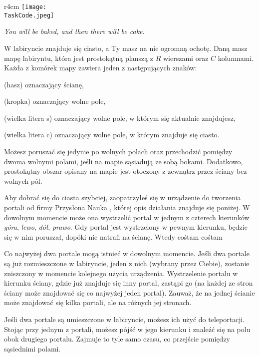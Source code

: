 \documentclass{boi2014-pl}
\renewcommand{\TaskCode}{portals}
\newcommand{\constant}[1]{{\tt #1}}
\begin{document}
    \begin{wrapfigure}[4]{r}{4cm}
        \vspace{-24pt}
		\texttt{[image: \\TaskCode.jpeg]}
	\end{wrapfigure}

    \emph{You will be baked, and then there will be cake.}

    W labiryncie znajduje się ciasto, a Ty masz na nie ogromną ochotę.
    Daną masz mapę labiryntu, która jest prostokątną planszą z $R$ wierszami oraz $C$ kolumnami.
    Każda z komórek mapy zawiera jeden z następujących znaków:
    \begin{description}[itemindent=1pt]
    	\item[\constant{\#}] (hasz) oznaczający ścianę,
        \item[\constant{.}] (kropka) oznaczający wolne pole,
        \item[\constant{S}] (wielka litera s) oznaczający wolne pole, w którym się aktualnie znajdujesz,
        \item[\constant{C}] (wielka litera c) oznaczający wolne pole, w którym znajduje się ciasto.
    \end{description}

    Możesz poruszać się jedynie po wolnych polach oraz przechodzić pomiędzy dwoma wolnymi polami,
    jeśli na mapie sąsiadują ze sobą bokami.
    Dodatkowo, prostokątny obszar opisany na mapie jest otoczony z zewnątrz przez ściany bez wolnych pól.

    Aby dobrać się do ciasta szybciej, zaopatrzyłeś się w urządzenie do tworzenia portali od firmy
    Przysłona Nauka \texttrademark{}, której opis działania znajduje się poniżej.
    W dowolnym momencie może ona wystrzelić portal w jednym z czterech kierunków \emph{góra}, \emph{lewo}, \emph{dół}, \emph{prawo}.
    Gdy portal jest wystrzelony w pewnym kierunku, będzie się w nim poruszał, dopóki nie natrafi na ścianę.
    Wtedy cośtam cośtam
    
    Co najwyżej dwa portale mogą istnieć w dowolnym momencie.
    Jeśli dwa portale są już rozmieszczone w labiryncie, jeden z nich (wybrany przez Ciebie), zostanie zniszczony w momencie kolejnego użycia urządzenia.
    Wystrzelenie portalu w kierunku ściany, gdzie już znajduje się inny portal, zastąpi go (na każdej ze stron ściany może znajdować się co najwyżej jeden portal).
    Zauważ, że na jednej ścianie może znajdować się kilka portali, ale na różnych jej stronach.

    Jeśli dwa portale są umieszczone w labiryncie, możesz ich użyć do teleportacji.
    Stojąc przy jednym z portali, możesz pójść w jego kierunku i znaleźć się na polu obok drugiego portalu.
    Zajmuje to tyle samo czasu, co przejście pomiędzy sąsiednimi polami.
\end{document}

